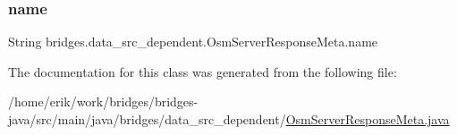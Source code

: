 \subsubsection{\texorpdfstring{name}{name}}
{\footnotesize\ttfamily String bridges.\+data\+\_\+src\+\_\+dependent.\+Osm\+Server\+Response\+Meta.\+name}



The documentation for this class was generated from the following file\+:\begin{DoxyCompactItemize}
\item 
/home/erik/work/bridges/bridges-\/java/src/main/java/bridges/data\+\_\+src\+\_\+dependent/\hyperlink{_osm_server_response_meta_8java}{Osm\+Server\+Response\+Meta.\+java}\end{DoxyCompactItemize}
